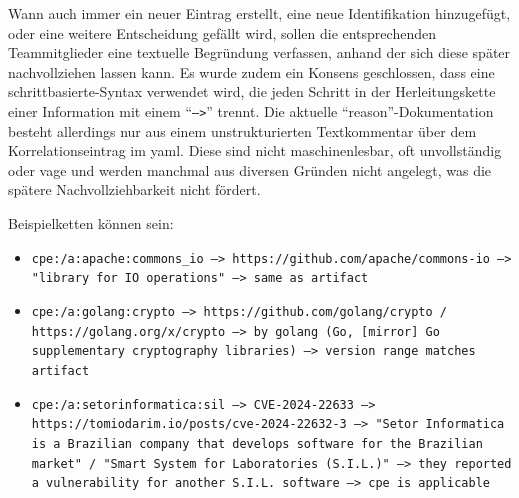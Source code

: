 
Wann auch immer ein neuer Eintrag erstellt, eine neue Identifikation hinzugefügt, oder eine weitere Entscheidung gefällt wird, sollen die entsprechenden Teammitglieder eine textuelle Begründung verfassen, anhand der sich diese später nachvollziehen lassen kann.
Es wurde zudem ein Konsens geschlossen, dass eine schrittbasierte-Syntax verwendet wird, die jeden Schritt in der Herleitungskette einer Information mit einem \enquote{\texttt{-->}} trennt.
Die aktuelle \enquote{reason}-Dokumentation besteht allerdings nur aus einem unstrukturierten Textkommentar über dem Korrelationseintrag im \acrshort{yaml}.
Diese sind nicht maschinenlesbar, oft unvollständig oder vage und werden manchmal aus diversen Gründen nicht angelegt, was die spätere Nachvollziehbarkeit nicht fördert.

Beispielketten können sein:

\begin{itemize}
    \itemsep0em
    \item \texttt{cpe:/a:apache:commons\_io --> https://github.com/apache/commons-io --> "library for IO operations" --> same as artifact}
    \item \texttt{cpe:/a:golang:crypto --> https://github.com/golang/crypto / https://golang.org/x/crypto --> by golang (Go, [mirror] Go supplementary cryptography libraries) --> version range matches artifact}
    \item \texttt{cpe:/a:setorinformatica:sil --> CVE-2024-22633 --> https://tomiodarim.io/posts/cve-2024-22632-3 --> "Setor Informatica is a Brazilian company that develops software for the Brazilian market" / "Smart System for Laboratories (S.I.L.)" --> they reported a vulnerability for another S.I.L. software --> cpe is applicable}
\end{itemize}

